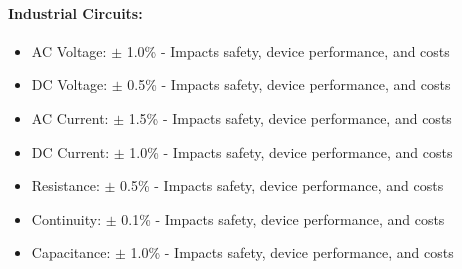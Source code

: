  \paragraph{Industrial Circuits:}
  \begin{itemize}
      \item AC Voltage: $\pm$ 1.0\% - Impacts safety, device performance, and costs
      \item DC Voltage: $\pm$ 0.5\% - Impacts safety, device performance, and costs
      \item AC Current: $\pm$ 1.5\% - Impacts safety, device performance, and costs
      \item DC Current: $\pm$ 1.0\% - Impacts safety, device performance, and costs
      \item Resistance: $\pm$ 0.5\% - Impacts safety, device performance, and costs
      \item Continuity: $\pm$ 0.1\% - Impacts safety, device performance, and costs
      \item Capacitance: $\pm$ 1.0\% - Impacts safety, device performance, and costs
  \end{itemize}
